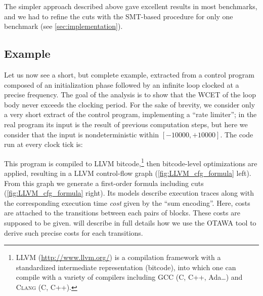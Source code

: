 \documentclass[a4paper,twocolumn,11pt]{article}
\begin{document}
The simpler approach described above gave excellent results in most benchmarks, and we had to refine the cuts with the SMT-based procedure for only one benchmark (see \autoref{sec:implementation}).
\subsection{Example}
\label{example}
Let us now see a short, but complete example, extracted from a control program composed of an initialization phase followed by an infinite loop clocked at a precise frequency. The goal of the analysis is to show that the WCET of the loop body never exceeds the clocking period. For the sake of brevity, we consider only a very short extract of the control program, implementing a ``rate limiter''; in the real program its input is the result of previous computation steps, but here we consider that the input is nondeterministic within $[-10000,+10000]$. The code run at every clock tick is:



This program is compiled to LLVM bitcode,\footnote{LLVM (\url{http://www.llvm.org/}) \parencite{DBLP:conf/cgo/LattnerA04} is a compilation framework with a standardized intermediate representation (bitcode), into which one can compile with a variety of compilers including GCC (C, C++, Ada\dots) and \textsc{Clang} (C, C++).}
then bitcode-level optimizations are applied, resulting in a LLVM control-flow graph (\autoref{fig:LLVM_cfg_formula} left). From this graph we generate a first-order formula including cuts (\autoref{fig:LLVM_cfg_formula} right). Its models describe execution traces along with the corresponding execution time \emph{cost} given by the ``sum encoding''.
Here, costs are attached to the transitions between each pairs of blocks. These costs are supposed to be given.  will describe in full details how we use the \textsc{OTAWA} tool to derive such precise costs for each transitions.
\end{document}
